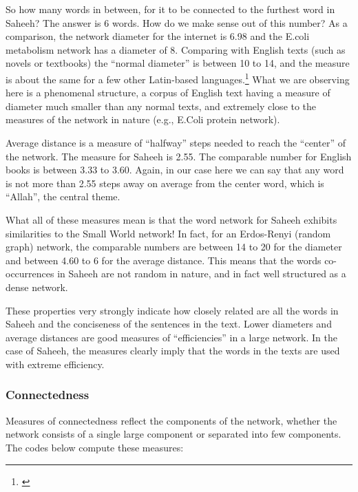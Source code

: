 \documentclass[
]{article}
\newenvironment{Shaded}{\begin{snugshade}}{\end{snugshade}}
\newcommand{\FunctionTok}[1]{\textcolor[rgb]{0.13,0.29,0.53}{\textbf{#1}}}
\newcommand{\NormalTok}[1]{#1}
\newcommand{\OtherTok}[1]{\textcolor[rgb]{0.56,0.35,0.01}{#1}}
\newcommand{\SpecialCharTok}[1]{\textcolor[rgb]{0.81,0.36,0.00}{\textbf{#1}}}
\begin{document}
So how many words in between, for it to be connected to the furthest word in Saheeh? The answer is 6 words. How do we make sense out of this number? As a comparison, the network diameter for the internet is 6.98 and the E.coli metabolism network has a diameter of 8. Comparing with English texts (such as novels or textbooks) the ``normal diameter'' is between 10 to 14, and the measure is about the same for a few other Latin-based languages.\footnote{\citet{ban2014}} What we are observing here is a phenomenal structure, a corpus of English text having a measure of diameter much smaller than any normal texts, and extremely close to the measures of the network in nature (e.g., E.Coli protein network).

Average distance is a measure of ``halfway'' steps needed to reach the ``center'' of the network. The measure for Saheeh is 2.55. The comparable number for English books is between 3.33 to 3.60. Again, in our case here we can say that any word is not more than 2.55 steps away on average from the center word, which is ``Allah'', the central theme.

What all of these measures mean is that the word network for Saheeh exhibits similarities to the Small World network! In fact, for an Erdos-Renyi (random graph) network, the comparable numbers are between 14 to 20 for the diameter and between 4.60 to 6 for the average distance.\citep{ban2014} This means that the words co-occurrences in Saheeh are not random in nature, and in fact well structured as a dense network.

These properties very strongly indicate how closely related are all the words in Saheeh and the conciseness of the sentences in the text. Lower diameters and average distances are good measures of ``efficiencies'' in a large network. In the case of Saheeh, the measures clearly imply that the words in the texts are used with extreme efficiency.

\hypertarget{connectedness}{%
\subsubsection{Connectedness}\label{connectedness}}

Measures of connectedness reflect the components of the network, whether the network consists of a single large component or separated into few components. The codes below compute these measures:

\footnotesize

\begin{Shaded}
\end{Shaded}
\end{document}
